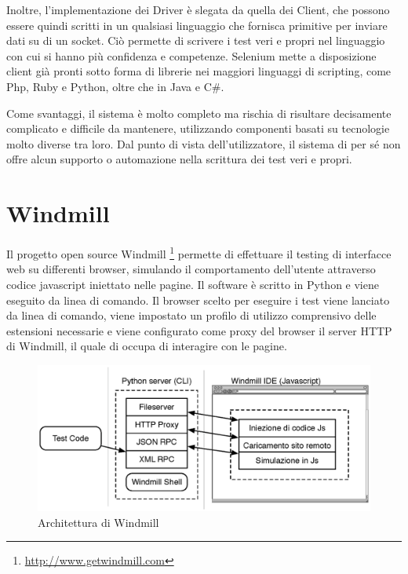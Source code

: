 Inoltre, l'implementazione dei Driver è slegata da quella dei Client, che possono essere quindi scritti in un qualsiasi linguaggio che fornisca primitive per inviare dati su di un socket. Ciò permette di scrivere i test veri e propri nel linguaggio con cui si hanno più confidenza e competenze. Selenium mette a disposizione client già pronti sotto forma di librerie nei maggiori linguaggi di scripting, come Php, Ruby e Python, oltre che in Java e C\#.

Come svantaggi, il sistema è molto completo ma rischia di risultare decisamente complicato e difficile da mantenere, utilizzando componenti basati su tecnologie molto diverse tra loro. Dal punto di vista dell'utilizzatore, il sistema di per sé non offre alcun supporto o automazione nella scrittura dei test veri e propri. 

\section{Windmill}

Il progetto open source Windmill \footnote{\url{http://www.getwindmill.com}} permette di effettuare il testing di interfacce web su differenti browser, simulando il comportamento dell'utente attraverso codice javascript iniettato nelle pagine. Il software è scritto in Python e viene eseguito da linea di comando. Il browser scelto per eseguire i test viene lanciato da linea di comando, viene impostato un profilo di utilizzo comprensivo delle estensioni necessarie e viene configurato come proxy del browser il server HTTP di Windmill, il quale di occupa di interagire con le pagine. 

\begin{figure}[htbp]
\begin{center}
\includegraphics[width=\textwidth]{images/windmill_architecture.eps}
\caption{Architettura di Windmill}
\label{fig:windmillArchitecture}
\end{center}
\end{figure}

